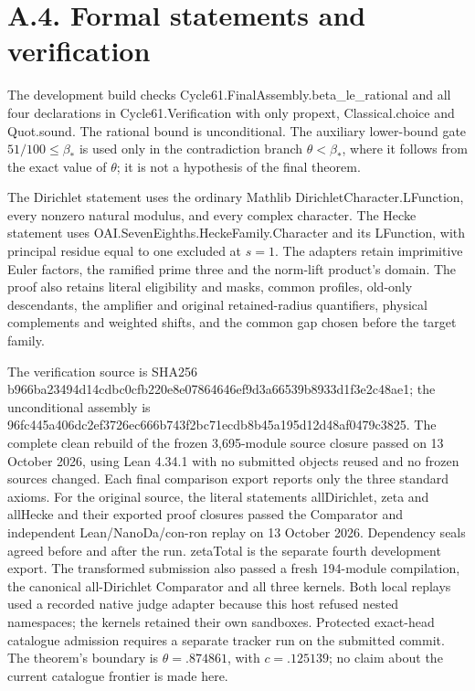 \documentclass[11pt,a4paper]{article}
\newcommand{\sourcecode}[1]{{\small\ttfamily #1}}
\begin{document}
\hypertarget{a.4.-formal-statements-and-verification}{%
\section{A.4. Formal statements and
verification}\label{a.4.-formal-statements-and-verification}}

The development build checks
\sourcecode{Cycle61.\allowbreak{}FinalAssembly.\allowbreak{}beta\_\allowbreak{}\allowbreak{}le\_\allowbreak{}\allowbreak{}rational} and all four
declarations in \sourcecode{Cycle61.\allowbreak{}Verification} with only
\sourcecode{propext}, \sourcecode{Classical.\allowbreak{}choice} and \sourcecode{Quot.\allowbreak{}sound}. The
rational bound is unconditional. The auxiliary lower-bound gate
\(51/100\le\beta_*\) is used only in the contradiction branch
\(\theta<\beta_*\), where it follows from the exact value of \(\theta\);
it is not a hypothesis of the final theorem.

The Dirichlet statement uses the ordinary Mathlib
\sourcecode{Dirichlet\allowbreak{}Character.\allowbreak{}LFunction}, every nonzero natural modulus,
and every complex character. The Hecke statement uses
\sourcecode{OAI.\allowbreak{}Seven\allowbreak{}Eighths.\allowbreak{}Hecke\allowbreak{}Family.\allowbreak{}Character} and its
\sourcecode{LFunction}, with principal residue equal to one excluded at
\(s=1\). The adapters retain imprimitive Euler factors, the ramified
prime three and the norm-lift product's domain. The proof also retains
literal eligibility and masks, common profiles, old-only descendants,
the amplifier and original retained-radius quantifiers, physical
complements and weighted shifts, and the common gap chosen before the
target family.

The verification source is SHA256
\sourcecode{b966ba23\allowbreak{}494d14cd\allowbreak{}bc0cfb22\allowbreak{}0e8e0786\allowbreak{}4646ef9d\allowbreak{}3a66539b\allowbreak{}8933d1f3\allowbreak{}e2c48ae1};
the unconditional assembly is
\sourcecode{96fc445a\allowbreak{}406dc2ef\allowbreak{}3726ec66\allowbreak{}6b743f2b\allowbreak{}c71ecdb8\allowbreak{}b45a195d\allowbreak{}12d48af0\allowbreak{}479c3825}.
The complete clean rebuild of the frozen 3,695-module source closure
passed on 13 October 2026, using Lean 4.34.1 with no submitted objects
reused and no frozen sources changed. Each final comparison export
reports only the three standard axioms. For the original source, the literal statements
\sourcecode{all\allowbreak{}Dirichlet}, \sourcecode{zeta} and
\sourcecode{all\allowbreak{}Hecke} and their exported proof closures
passed the Comparator and independent Lean/NanoDa/con-ron replay on
13 October 2026. Dependency seals agreed before and after the run.
\sourcecode{zeta\allowbreak{}Total} is the separate fourth development
export. The transformed submission also passed a fresh 194-module
compilation, the canonical all-Dirichlet Comparator and all three
kernels. Both local replays used a recorded native judge adapter
because this host refused nested namespaces; the kernels retained
their own sandboxes. Protected exact-head catalogue admission
requires a separate tracker run on the submitted commit. The theorem's
boundary is \(\theta=.874861\), with \(c=.125139\); no claim about the
current catalogue frontier is made here.
\end{document}
